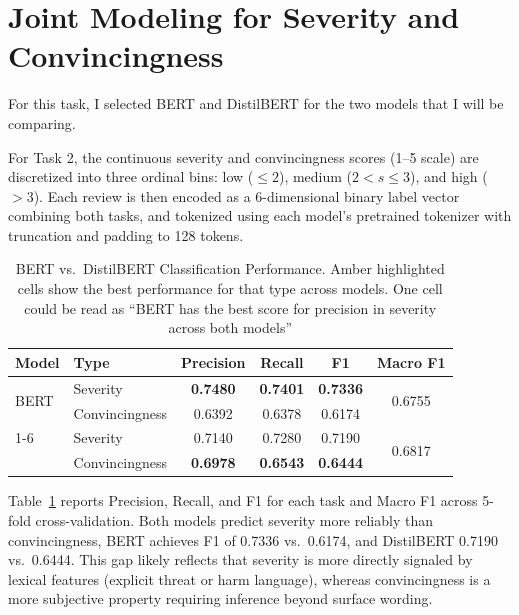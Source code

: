 \documentclass[12pt]{article}
\begin{document}
\section{Joint Modeling for Severity and Convincingness}

For this task, I selected BERT and DistilBERT for the two models that I will be comparing. 

For Task 2, the continuous severity and convincingness scores (1–5 scale) are discretized 
into three ordinal bins: low ($\leq 2$), medium ($2 < s \leq 3$), and high ($> 3$). Each 
review is then encoded as a 6-dimensional binary label vector combining both tasks, and 
tokenized using each model's pretrained tokenizer with truncation and padding to 128 tokens.

\begin{table}[H]
    \centering
    \renewcommand{\arraystretch}{1.4}
    \begin{tabular}{l l c c c c}
        \toprule
        \rowcolor{modelheader}
        \color{white}\textbf{Model} & \color{white}\textbf{Type} & \color{white}\textbf{Precision} & \color{white}\textbf{Recall} & \color{white}\textbf{F1} & \color{white}\textbf{Macro F1} \\
        \midrule
        \multirow{2}{*}{BERT}       & Severity       & \cellcolor{modelhighlight}\textbf{0.7480} & \cellcolor{modelhighlight}\textbf{0.7401} & \cellcolor{modelhighlight}\textbf{0.7336} & \multirow{2}{*}{0.6755} \\
                                     & Convincingness & 0.6392 & 0.6378 & 0.6174 & \\
        \cmidrule{1-6}
                          \multirow{2}{*}{DistilBERT} & Severity       & 0.7140 & 0.7280 & 0.7190 & \multirow{2}{*}{0.6817} \\
                                                       & Convincingness & \cellcolor{modelhighlight}\textbf{0.6978} & \cellcolor{modelhighlight}\textbf{0.6543} & \cellcolor{modelhighlight}\textbf{0.6444} & \\
        \bottomrule
    \end{tabular}
    \caption{BERT vs.\ DistilBERT Classification Performance. Amber highlighted cells show the best
    performance for that type across models. One cell could be read as ``BERT has the best score for
    precision in severity across both models''}
    \label{tab:model-comparison}
\end{table}

Table~\ref{tab:model-comparison} reports Precision, Recall, and F1 for each task and Macro F1 across
5-fold cross-validation. Both models predict severity more reliably than convincingness, 
BERT achieves F1 of 0.7336 vs.\ 0.6174, and DistilBERT 0.7190 vs.\ 0.6444. This gap likely reflects 
that severity is more directly signaled by lexical features (explicit threat or harm language), 
whereas convincingness is a more subjective property requiring inference beyond surface wording.
\end{document}
